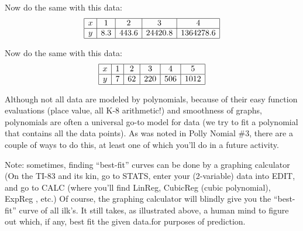 \begin{prob}
Now do the same with this data:
\[
\begin{array}{|c|c|c|c|c|}\hline
x & 1 & 2 & 3 & 4 \\ \hline
y & 8.3 & 443.6 & 24420.8 & 1364278.6 \\ \hline
\end{array}
\]

Now do the same with this data:
\[
\begin{array}{|c|c|c|c|c|c|}\hline
x & 1 & 2 & 3 & 4 & 5 \\ \hline
y & 7 & 62 & 220 & 506 & 1012 \\ \hline 
\end{array}
\]
\end{prob}

\begin{prob}
Although not all data are modeled by polynomials, because of their
easy function evaluations (place value, all K-8 arithmetic!) and
smoothness of graphs, polynomials are often a universal go-to model
for data (we try to fit a polynomial that contains all the data
points).  As was noted in Polly Nomial \#3, there are a couple of ways
to do this, at least one of which you'll do in a future activity.

Note: sometimes, finding ``best-fit'' curves can be done by a graphing
calculator (On the TI-83 and its kin, go to STATS, enter your
(2-variable) data into EDIT, and go to CALC (where you'll find LinReg,
CubicReg (cubic polynomial), ExpReg , etc.)  Of course, the
graphing calculator will blindly give you the ``best-fit'' curve of
all ilk's.  It still takes, as illustrated above, a human mind to
figure out which, if any, best fit the given data.for purposes of
prediction.
\end{prob}

